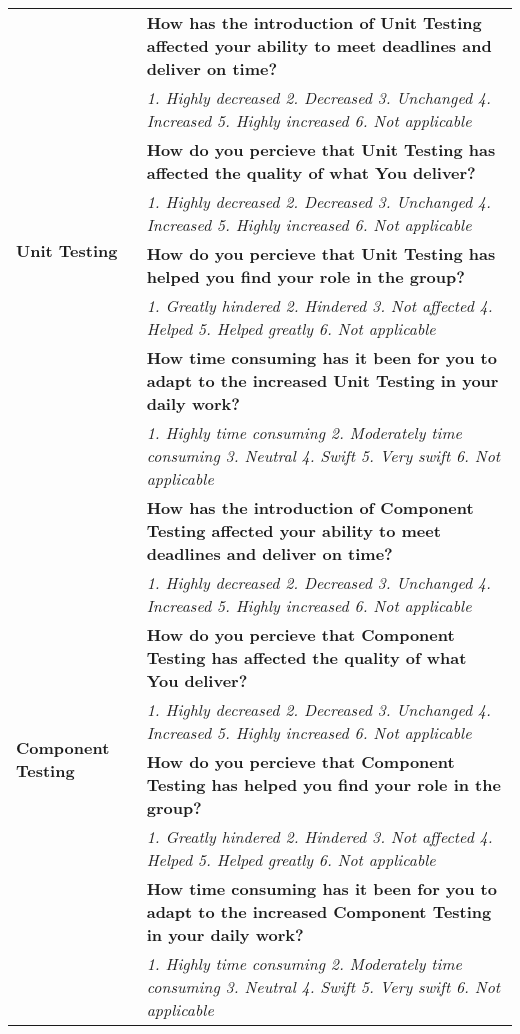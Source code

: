 \documentclass[final_report_innit.tex]{subfiles}
\begin{document}
\begin{center}
\begin{table}[h]
\begin{tabular}[t]{| p{4.5cm} | p{13cm} |}
	\hline
	\multirow{8}{*}{\textbf{Unit Testing}} & \cellcolor{greyOdd}\textbf{How has the introduction of Unit Testing affected your ability to meet deadlines and deliver on time?} \\ 
	& \textit{1. Highly decreased 2. Decreased 3. Unchanged 4. Increased 5. Highly increased 6. Not applicable} \\ \cline{2-2}
	& \cellcolor{greyOdd}\textbf{How do you percieve that Unit Testing has affected the quality of what You deliver?} \\
	& \textit{1. Highly decreased 2. Decreased 3. Unchanged 4. Increased 5. Highly increased 6. Not applicable} \\ \cline{2-2}
	& \cellcolor{greyOdd}\textbf{How do you percieve that Unit Testing has helped you find your role in the group?} \\
	& \textit{1. Greatly hindered 2. Hindered 3. Not affected 4. Helped 5. Helped greatly 6. Not applicable} \\ \cline{2-2}
	& \cellcolor{greyOdd}\textbf{How time consuming has it been for you to adapt to the increased Unit Testing in your daily work?} \\
	& \textit{1. Highly time consuming 2. Moderately time consuming 3. Neutral 4. Swift 5. Very swift 6. Not applicable} \\
	\hline
	\multirow{9}{*}{\textbf{Component Testing}} & \cellcolor{greyOdd}\textbf{How has the introduction of Component Testing affected your ability to meet deadlines and deliver on time?} \\ 
	& \textit{1. Highly decreased 2. Decreased 3. Unchanged 4. Increased 5. Highly increased 6. Not applicable} \\ \cline{2-2}
	& \cellcolor{greyOdd}\textbf{How do you percieve that Component Testing has affected the quality of what You deliver?} \\
	& \textit{1. Highly decreased 2. Decreased 3. Unchanged 4. Increased 5. Highly increased 6. Not applicable} \\ \cline{2-2}
	& \cellcolor{greyOdd}\textbf{How do you percieve that Component Testing has helped you find your role in the group?} \\
	& \textit{1. Greatly hindered 2. Hindered 3. Not affected 4. Helped 5. Helped greatly 6. Not applicable} \\ \cline{2-2}
	& \cellcolor{greyOdd}\textbf{How time consuming has it been for you to adapt to the increased Component Testing in your daily work?} \\
	& \textit{1. Highly time consuming 2. Moderately time consuming 3. Neutral 4. Swift 5. Very swift 6. Not applicable} \\
	\hline
\end{tabular}
\end{table}
\end{center}
\clearpage
\end{document}
